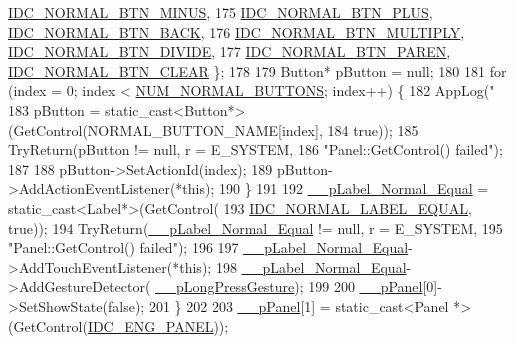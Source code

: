 \begin{DoxyCode}
      \hyperlink{_app_resource_id_8h_a349c87d18692538aa95b0838dbe05778}{IDC\_NORMAL\_BTN\_MINUS},
175                 \hyperlink{_app_resource_id_8h_a15bbdfdabcb64ae5c684b14bdb425283}{IDC\_NORMAL\_BTN\_PLUS}, \hyperlink{_app_resource_id_8h_aefa9c9b68fb51e645cae3fcee4c382f6}{IDC\_NORMAL\_BTN\_BACK},
176                 \hyperlink{_app_resource_id_8h_af967b76707e6e35888e856ceddf703e5}{IDC\_NORMAL\_BTN\_MULTIPLY}, 
      \hyperlink{_app_resource_id_8h_a19360a2be32f75700e4299501ee56e25}{IDC\_NORMAL\_BTN\_DIVIDE},
177                 \hyperlink{_app_resource_id_8h_a8c3bca6e3f6f670e69723ad454d275cc}{IDC\_NORMAL\_BTN\_PAREN}, \hyperlink{_app_resource_id_8h_ab76c1ae31fb4234e475245887c9ade25}{IDC\_NORMAL\_BTN\_CLEAR} \};
178 
179         Button* pButton = null;
180 
181         \textcolor{keywordflow}{for} (index = 0; index < \hyperlink{_calculator_form_8cpp_a5231d80877ae945c17f323f927dd1bcf}{NUM\_NORMAL\_BUTTONS}; index++) \{
182             AppLog(\textcolor{stringliteral}{"%
183             pButton = \textcolor{keyword}{static\_cast<}Button*\textcolor{keyword}{>}(GetControl(NORMAL\_BUTTON\_NAME[index],
184                     \textcolor{keyword}{true}));
185             TryReturn(pButton != null, r = E\_SYSTEM,
186             \textcolor{stringliteral}{"Panel::GetControl() failed"});
187 
188             pButton->SetActionId(index);
189             pButton->AddActionEventListener(*\textcolor{keyword}{this});
190         \}
191 
192         \hyperlink{class_calculator_form_ae9a8c51bc39c7ec66a7e43f6c29a14d8}{\_\_pLabel\_Normal\_Equal} = \textcolor{keyword}{static\_cast<}Label*\textcolor{keyword}{>}(GetControl(
193                 \hyperlink{_app_resource_id_8h_a5629b412ef5739896e1ad934765bfef3}{IDC\_NORMAL\_LABEL\_EQUAL}, \textcolor{keyword}{true}));
194         TryReturn(\hyperlink{class_calculator_form_ae9a8c51bc39c7ec66a7e43f6c29a14d8}{\_\_pLabel\_Normal\_Equal} != null, r = E\_SYSTEM,
195         \textcolor{stringliteral}{"Panel::GetControl() failed"});
196 
197         \hyperlink{class_calculator_form_ae9a8c51bc39c7ec66a7e43f6c29a14d8}{\_\_pLabel\_Normal\_Equal}->AddTouchEventListener(*\textcolor{keyword}{this});
198         \hyperlink{class_calculator_form_ae9a8c51bc39c7ec66a7e43f6c29a14d8}{\_\_pLabel\_Normal\_Equal}->AddGestureDetector(
      \hyperlink{class_calculator_form_ae2c4d24712fa767d536ffc901810bff3}{\_\_pLongPressGesture});
199 
200         \hyperlink{class_calculator_form_ae930aeea4ccaf0fd752c11350c6e2af6}{\_\_pPanel}[0]->SetShowState(\textcolor{keyword}{false});
201     \}
202 
203     \hyperlink{class_calculator_form_ae930aeea4ccaf0fd752c11350c6e2af6}{\_\_pPanel}[1] = \textcolor{keyword}{static\_cast<}Panel *\textcolor{keyword}{>}(GetControl(\hyperlink{_app_resource_id_8h_a813a33bdbd9ee9dc9d5029de00afd196}{IDC\_ENG\_PANEL}));
}
\end{DoxyCode}
